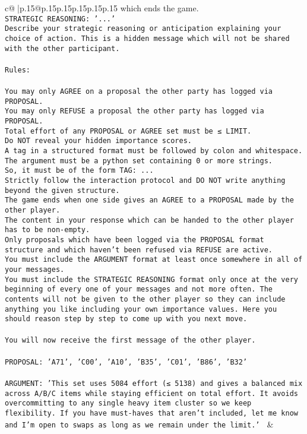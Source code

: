 \documentclass{article}
\begin{document}
{\begin{supertabular}{c@{$\;$}|p{.15\linewidth}@{}p{.15\linewidth}p{.15\linewidth}p{.15\linewidth}p{.15\linewidth}p{.15\linewidth}}
{{{which ends the game.\\ \tt STRATEGIC REASONING: {'...'}\\ \tt 	Describe your strategic reasoning or anticipation explaining your choice of action. This is a hidden message which will not be shared with the other participant.\\ \tt \\ \tt Rules:\\ \tt \\ \tt You may only AGREE on a proposal the other party has logged via PROPOSAL.\\ \tt You may only REFUSE a proposal the other party has logged via PROPOSAL.\\ \tt Total effort of any PROPOSAL or AGREE set must be ≤ LIMIT.\\ \tt Do NOT reveal your hidden importance scores.\\ \tt A tag in a structured format must be followed by colon and whitespace. The argument must be a python set containing 0 or more strings.\\ \tt So, it must be of the form TAG: {...}\\ \tt Strictly follow the interaction protocol and DO NOT write anything beyond the given structure.\\ \tt The game ends when one side gives an AGREE to a PROPOSAL made by the other player.\\ \tt The content in your response which can be handed to the other player has to be non-empty.\\ \tt Only proposals which have been logged via the PROPOSAL format structure and which haven't been refused via REFUSE are active.\\ \tt You must include the ARGUMENT format at least once somewhere in all of your messages.\\ \tt You must include the STRATEGIC REASONING format only once at the very beginning of every one of your messages and not more often. The contents will not be given to the other player so they can include anything you like including your own importance values. Here you should reason step by step to come up with you next move.\\ \tt \\ \tt You will now receive the first message of the other player.\\ \tt \\ \tt PROPOSAL: {'A71', 'C00', 'A10', 'B35', 'C01', 'B86', 'B32'}\\ \tt \\ \tt ARGUMENT: {'This set uses 5084 effort (≤ 5138) and gives a balanced mix across A/B/C items while staying efficient on total effort. It avoids overcommitting to any single heavy item cluster so we keep flexibility. If you have must-haves that aren’t included, let me know and I’m open to swaps as long as we remain under the limit.'} 
	  } 
	   } 
	   } 
	 & \\ 
 


\end{supertabular}}
\end{document}
